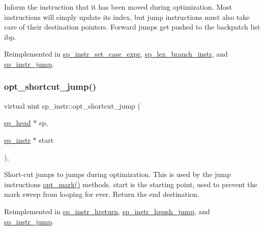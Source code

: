 Inform the instruction that it has been moved during optimization. Most instructions will simply update its index, but jump instructions must also take care of their destination pointers. Forward jumps get pushed to the backpatch list \textquotesingle{}ibp\textquotesingle{}. 

Reimplemented in \mbox{\hyperlink{classsp__instr__set__case__expr_abc03926238c4442d32e3bfb4d89fcac1}{sp\+\_\+instr\+\_\+set\+\_\+case\+\_\+expr}}, \mbox{\hyperlink{classsp__lex__branch__instr_ae7d74a74399102d85e481c4e46751cfe}{sp\+\_\+lex\+\_\+branch\+\_\+instr}}, and \mbox{\hyperlink{classsp__instr__jump_a84478dd9ceeedc8693c60d77d24816f7}{sp\+\_\+instr\+\_\+jump}}.

\mbox{\label{classsp__instr_aa06a5e2fcf128a0ed13e802b11efaba0}} 
\subsubsection{\texorpdfstring{opt\+\_\+shortcut\+\_\+jump()}{opt\_shortcut\_jump()}}
{\footnotesize\ttfamily virtual uint sp\+\_\+instr\+::opt\+\_\+shortcut\+\_\+jump (\begin{DoxyParamCaption}\item[{\mbox{\hyperlink{classsp__head}{sp\+\_\+head}} $\ast$}]{sp,  }\item[{\mbox{\hyperlink{classsp__instr}{sp\+\_\+instr}} $\ast$}]{start }\end{DoxyParamCaption})\hspace{0.3cm}{\ttfamily [inline]}, {\ttfamily [virtual]}}

Short-\/cut jumps to jumps during optimization. This is used by the jump instructions\textquotesingle{} \mbox{\hyperlink{classsp__instr_a10b7b33a30316fca4cff5adfe98e282c}{opt\+\_\+mark()}} methods. \textquotesingle{}start\textquotesingle{} is the starting point, used to prevent the mark sweep from looping for ever. Return the end destination. 

Reimplemented in \mbox{\hyperlink{classsp__instr__hreturn_aad1c6b1378f1f2f26fb3be33622f0ce2}{sp\+\_\+instr\+\_\+hreturn}}, \mbox{\hyperlink{classsp__instr__hpush__jump_a7b00002d8497221812af5f222a2a1732}{sp\+\_\+instr\+\_\+hpush\+\_\+jump}}, and \mbox{\hyperlink{classsp__instr__jump_a7c0f595bd9f39e9b38cc1e06333c3db0}{sp\+\_\+instr\+\_\+jump}}.



